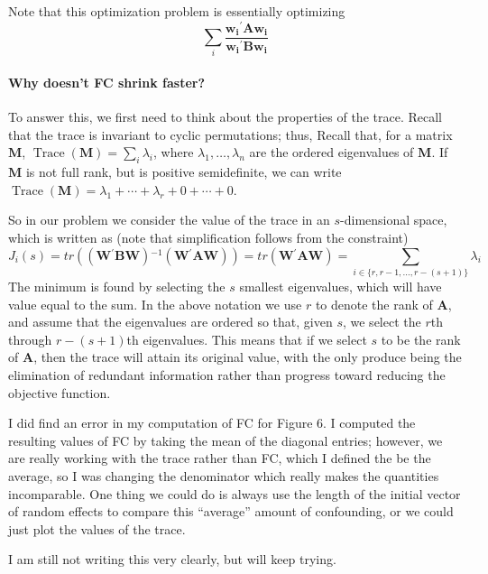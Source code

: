 \documentclass[12pt]{article} %
\newcommand{\inv}{\ensuremath{^{-1}}}
\newcommand{\trans}{\ensuremath{^\prime}}
\DeclareMathOperator{\tr}{Trace}
\DeclareMathOperator{\rank}{rank}
\begin{document}
Note that this optimization problem is essentially optimizing
\[
	\sum_i \frac{\bm{w_i\trans A w_i}}{\bm{w_i\trans B w_i}}
\]

\paragraph{Why doesn't FC shrink faster?\\}
To answer this, we first need to think about the properties of the trace. Recall that the trace is invariant to cyclic permutations; thus, 
Recall that, for a matrix $\bm{M}$, $\tr (\bm{M}) = \sum_i \lambda_i$, where $\lambda_1, \ldots, \lambda_n$ are the ordered eigenvalues of $\bm{M}$. If $\bm{M}$ is not full rank, but is positive semidefinite, we can write $\tr (\bm{M}) = \lambda_1 + \cdots + \lambda_r + 0 + \cdots + 0$. 

So in our problem we consider the value of the trace in an $s$-dimensional space, which is written as (note that simplification follows from the constraint)
\[
J_i(s)  
	= tr\left( \left(\bm{W\trans B W} \right)\inv \left(\bm{W\trans A W}\right) \right) 
	= tr\left(\bm{W\trans A W}\right)
 	= \sum_{i \in \{r, r-1, \ldots, r-(s+1) \}} \lambda_i
\]
The minimum is found by selecting the $s$ smallest eigenvalues, which will have value equal to the sum. In the above notation we use $r$ to denote the rank of $\bm{A}$, and assume that the eigenvalues are ordered so that, given $s$, we select the $r$th through $r-(s+1)$th eigenvalues. This means that if we select $s$ to be the rank of $\bm{A}$, then the trace will attain its original value, with the only produce being the elimination of redundant information rather than progress toward reducing the objective function.

I did find an error in my computation of FC for Figure 6. I computed the resulting values of FC by taking the mean of the diagonal entries; however, we are really working with the trace rather than FC, which I defined the be the average,  so I was changing the denominator which really makes the quantities incomparable. One thing we could do is always use the length of the initial vector of random effects to compare this ``average'' amount of confounding, or we could just plot the values of the trace.

I am still not writing this very clearly, but will keep trying.

\end{document}
